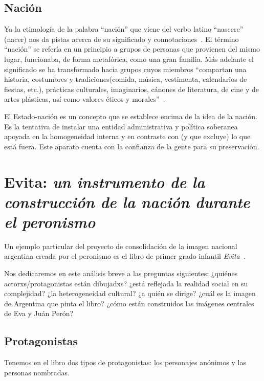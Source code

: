 \documentclass[
10pt, %
a4paper, %
oneside, %
headinclude,footinclude, %
]{scrartcl}
\begin{document}
\subsection{Nación}

Ya la etimología de la palabra ``nación'' que viene del verbo latino ``nascere'' (nacer) nos da pistas acerca de su significado y connotaciones~\autocite[p.189]{SzIr2009}.
El término ``nación'' se refería en un principio a grupos de personas que provienen del mismo lugar, funcionaba, de forma metafórica, como una gran familia.
Más adelante el significado se ha transformado hacia grupos cuyos miembros
``compartan una historia, costumbres y tradiciones(comida, música, vestimenta, calendarios de fiestas, etc.), prácticas culturales, imaginarios, cánones de literatura, de cine y de artes plásticas, así como valores éticos y morales''~\autocite[p.190]{SzIr2009}.

El Estado-nación es un concepto que se establece encima de la idea de la nación.
Es la tentativa de instalar una entidad administrativa y política soberanea apoyada en la homogeneidad interna y en contraste con (y que excluye) lo que está fuera.
Este aparato cuenta con la confianza de la gente para su preservación.

\section{Evita: \emph{un instrumento de la construcción de la nación durante el peronismo}}

Un ejemplo particular del proyecto de consolidación de la imagen nacional argentina creada por el peronismo es el libro de primer grado infantil \textit{Evita}~\autocite{Albornoz1952}.

Nos dedicaremos en este análisis breve a las preguntas siguientes:
¿quiénes actorxs/protagonistas están dibujadxs?
¿está reflejada la realidad social en su complejidad?
¿la heterogeneidad cultural?
¿a quién se dirige?
¿cuál es la imagen de Argentina que pinta el libro?
¿cómo están construidos las imágenes centrales de Eva y Juán Perón?

\subsection{Protagonistas}

Tenemos en el libro dos tipos de protagonistas: los personajes anónimos y las personas nombradas.
\end{document}
